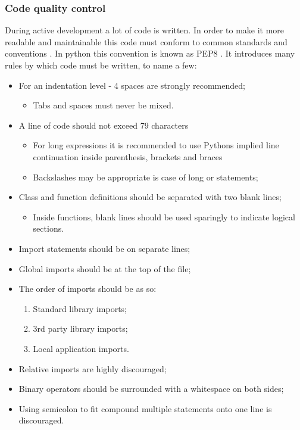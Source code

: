 \documentclass[12pt, fleqn, a4paper]{article}
\begin{document}
\subsubsection{Code quality control}
During active development a lot of code is written. In order to make it more readable and maintainable this code must conform to common standards and conventions \citep{martin_2018}. In python this convention is known as PEP8 \citep{pep8, pep20}. It introduces many rules by which code must be written, to name a few:
\begin{itemize}
	\item For an indentation level - 4 spaces are strongly recommended;
		\begin{itemize}
			\item Tabs and spaces must never be mixed.
		\end{itemize}
	\item A line of code should not exceed 79 characters 
		\begin{itemize} 
			\item For long expressions it is recommended to use Pythons implied line continuation inside parenthesis, brackets and braces 
			\item Backslashes may be appropriate is case of long  or  statements;
		\end{itemize}
	\item Class and function definitions should be separated with two blank lines;
		\begin{itemize}
			\item Inside functions, blank lines should be used sparingly to indicate logical sections.
		\end{itemize}
	\item Import statements should be on separate lines;
	\item Global imports should be at the top of the file;
	\item The order of imports should be as so:
		\begin{enumerate}
			\item Standard library imports;
			\item 3rd party library imports;
			\item Local application imports.
		\end{enumerate}
	\item Relative imports are highly discouraged;
	\item Binary operators should be surrounded with a whitespace on both sides;
	\item Using semicolon to fit compound multiple statements onto one line is discouraged.
\end{itemize}
\end{document}
